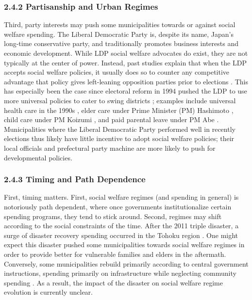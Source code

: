 \documentclass[preprint, 3p,
authoryear]{elsarticle} %
\begin{document}
\hypertarget{partisanship-and-urban-regimes}{%
\subsubsection{2.4.2 Partisanship and Urban
Regimes}\label{partisanship-and-urban-regimes}}

Third, party interests may push some municipalities towards or against
social welfare spending. The Liberal Democratic Party is, despite its
name, Japan's long-time conservative party, and traditionally promotes
business interests and economic development. While LDP social welfare
advocates do exist, they are not typically at the center of power.
Instead, past studies explain that when the LDP accepts social welfare
policies, it usually does so to counter any competitive advantage that
policy gives left-leaning opposition parties prior to elections
\citep{estevez_2020}. This has especially been the case since electoral
reform in 1994 pushed the LDP to use more universal policies to cater to
swing districts \citep{shinada_2018}; examples include universal health
care in the 1990s \citep{peng_2002}, elder care under Prime Minister
(PM) Hashimoto \citep{estevez_2020}, child care under PM Koizumi
\citep{nishioka_2018}, and paid parental leave under PM Abe
\citep{dalton_2017}. Municipalities where the Liberal Democratic Party
performed well in recently elections thus likely have little incentive
to adopt social welfare policies; their local officials and prefectural
party machine are more likely to push for developmental policies.

\hypertarget{timing-and-path-dependence}{%
\subsubsection{2.4.3 Timing and Path
Dependence}\label{timing-and-path-dependence}}

First, timing matters. First, social welfare regimes (and spending in
general) is notoriously path dependent, where once governments
institutionalize certain spending programs, they tend to stick around.
Second, regimes may shift according to the social constraints of the
time. After the 2011 triple disaster, a surge of disaster recovery
spending occurred in the Tohoku region
\citep{mochizuki_2014, aldrich_2019, noy_2023}. One might expect this
disaster pushed some municipalities towards social welfare regimes in
order to provide better for vulnerable families and elders in the
aftermath. Conversely, some municipalities rebuild primarily according
to central government instructions, spending primarily on infrastructure
while neglecting community spending
\citep{cheek_2020, aldrich_2019, fraser_et_al_2021_GEC}. As a result,
the impact of the disaster on social welfare regime evolution is
currently unclear.
\end{document}
